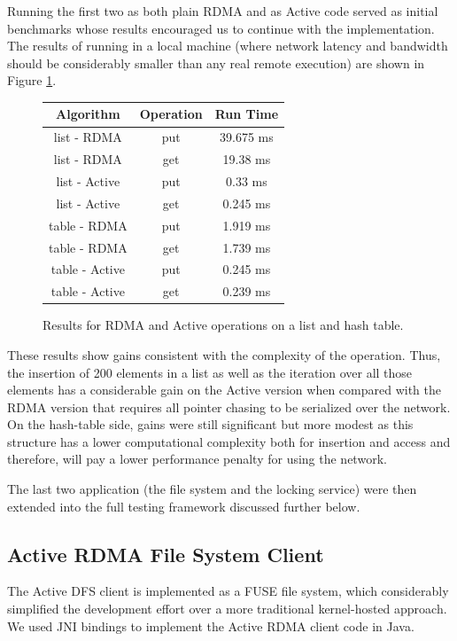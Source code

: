 \documentclass[10pt]{article}
\begin{document}
Running the first two as both plain RDMA and as Active code served as
initial benchmarks whose results encouraged us to continue with the
implementation. The results of running in a local machine (where
network latency and bandwidth should be considerably smaller than any
real remote execution) are shown in Figure \ref{res1}.

\begin{figure}[h!]
\center
\begin{tabular}{|ccc|}
\hline
Algorithm & Operation & Run Time\\
\hline
list - RDMA &  put & 39.675 ms \\
list - RDMA & get & 19.38 ms \\
\hline
list - Active & put & 0.33 ms \\
list - Active & get & 0.245 ms \\
\hline
\hline
table - RDMA  & put & 1.919 ms\\
table - RDMA   & get & 1.739 ms\\
\hline
table - Active  &put & 0.245 ms\\
table - Active & get & 0.239 ms\\
\hline
\end{tabular}
\caption{Results for RDMA and Active operations on a list and hash table.}
\label{res1}
\end{figure}

These results show gains consistent with the complexity of the
operation. Thus, the insertion of 200 elements in a list as well as
the iteration over all those elements has a considerable gain on the
Active version when compared with the RDMA version that requires all
pointer chasing to be serialized over the network. On the hash-table
side, gains were still significant but more modest as this structure
has a lower computational complexity both for insertion and access and
therefore, will pay a lower performance penalty for using the network.

The last two application (the file system and the locking service)
were then extended into the full testing framework discussed further
below.

\subsection{Active RDMA File System Client}

The Active DFS client is implemented as a FUSE file system, which
considerably simplified the development effort over a more traditional
kernel-hosted approach. We used JNI bindings to implement the Active
RDMA client code in Java.
\end{document}
